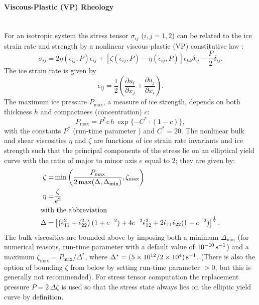 \paragraph{Viscous-Plastic (VP) Rheology\label{sec:pkg:seaice:VPrheology}}~\\
%
For an isotropic system the stress tensor $\sigma_{ij}$ ($i,j=1,2$) can
be related to the ice strain rate and strength by a nonlinear
viscous-plastic (VP) constitutive law \citep{hib79, zhang97}:
\begin{equation}
  \label{eq:vpequation}
  \sigma_{ij}=2\eta(\dot{\epsilon}_{ij},P)\dot{\epsilon}_{ij} 
  + \left[\zeta(\dot{\epsilon}_{ij},P) -
    \eta(\dot{\epsilon}_{ij},P)\right]\dot{\epsilon}_{kk}\delta_{ij}  
  - \frac{P}{2}\delta_{ij}.
\end{equation}
The ice strain rate is given by
\begin{equation*}
  \dot{\epsilon}_{ij} = \frac{1}{2}\left( 
    \frac{\partial{u_{i}}}{\partial{x_{j}}} +
    \frac{\partial{u_{j}}}{\partial{x_{i}}}\right).
\end{equation*}
The maximum ice pressure $P_{\max}$, a measure of ice strength, depends on
both thickness $h$ and compactness (concentration) $c$:
\begin{equation}
  P_{\max} = P^{*}c\,h\,\exp\{-C^{*}\cdot(1-c)\},
\label{eq:icestrength}
\end{equation}
with the constants $P^{*}$ (run-time parameter ) and
$C^{*}=20$. The nonlinear bulk and shear 
viscosities $\eta$ and $\zeta$ are functions of ice strain rate
invariants and ice strength such that the principal components of the
stress lie on an elliptical yield curve with the ratio of major to
minor axis $e$ equal to $2$; they are given by:
\begin{align*}
  \zeta =& \min\left(\frac{P_{\max}}{2\max(\Delta,\Delta_{\min})},
   \zeta_{\max}\right) \\
  \eta =& \frac{\zeta}{e^2} \\
  \intertext{with the abbreviation}
  \Delta = & \left[
    \left(\dot{\epsilon}_{11}^2+\dot{\epsilon}_{22}^2\right)
    (1+e^{-2}) +  4e^{-2}\dot{\epsilon}_{12}^2 + 
    2\dot{\epsilon}_{11}\dot{\epsilon}_{22} (1-e^{-2})
  \right]^{\frac{1}{2}}.
\end{align*}
The bulk viscosities are bounded above by imposing both a minimum
$\Delta_{\min}$ (for numerical reasons, run-time parameter
 with a default value of
$10^{-10}\text{\,s}^{-1}$) and a maximum $\zeta_{\max} =
P_{\max}/\Delta^*$, where
$\Delta^*=(5\times10^{12}/2\times10^4)\text{\,s}^{-1}$. (There is also
the option of bounding $\zeta$ from below by setting run-time
parameter  $>0$, but this is generally not
recommended). For stress tensor computation the replacement pressure $P
= 2\,\Delta\zeta$ \citep{hibler95} is used so that the stress state
always lies on the elliptic yield curve by definition.

